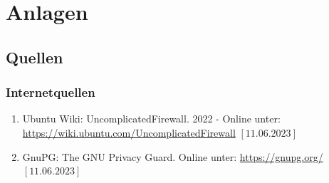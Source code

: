 \documentclass[a4paper, 11pt]{scrartcl}
\begin{document}
\newpage
\section{Anlagen}




\subsection{Quellen}\label{ch:src}
\subsubsection{Internetquellen}\label{ch:src_internet}
\begin{enumerate}
    \item Ubuntu Wiki: UncomplicatedFirewall. 2022 - Online unter: \newline\url{https://wiki.ubuntu.com/UncomplicatedFirewall} $\left[\text{11.06.2023}\right]$\label{src:ufw}
    \item GnuPG: The GNU Privacy Guard. Online unter: \newline\url{https://gnupg.org/} $\left[\text{11.06.2023}\right]$\label{src:gnupg}
\end{enumerate}
\begin{small}

\end{small}
\end{document}
